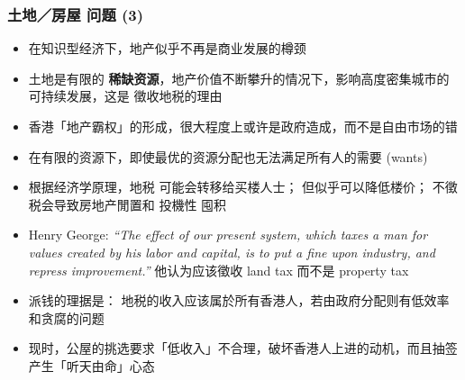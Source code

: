 \documentclass[10pt]{beamer}
\newcommand{\emp}[1]{{\color{blue}\textbf{#1}}}
\begin{document}
\begin{frame}
\frametitle{土地／房屋 问题 (3)}
\begin{itemize}
	\item 在知识型经济下，地产似乎不再是商业发展的樽颈
	
	\item 土地是有限的 \emp{稀缺资源}，地产价值不断攀升的情况下，影响高度密集城市的 可持续发展，这是 徵收地税的理由
	
	\item 香港「地产霸权」的形成，很大程度上或许是政府造成，而不是自由市场的错

	\nocite{Ryan-Collins2017}
	\nocite{Farvacque-Vitkoviac1992}
	\nocite{Blomley2004}
	\nocite{Linklater2013}
	\nocite{Adams2015}
	\nocite{简德三2012}
	\nocite{Poon2011}
	\nocite{潘慧娴2010}
	\nocite{OSullivan2012}
	\nocite{Rithmire2015}
	\nocite{Squires2013}
	\nocite{Harvey1996}
	\nocite{Girling1997}
	\nocite{Balia2009}
	\nocite{Peteri2003}
	\nocite{陈云2011}
	\nocite{周其仁2018}
	\nocite{Field2008}
	\nocite{Posner2018}

	\item 在有限的资源下，即使最优的资源分配也无法满足所有人的需要 (wants)

	\item 根据经济学原理，地税 可能会转移给买楼人士； 但似乎可以降低楼价； 不徵税会导致房地产閒置和 投機性 囤积
	
	\item Henry George: \textrm{\textit{``The effect of our present system, which taxes a man for values created by his labor and capital, is to put a fine upon industry, and repress improvement.''}} 他认为应该徵收 land tax 而不是 property tax

	\item 派钱的理据是： 地税的收入应该属於所有香港人，若由政府分配则有低效率和贪腐的问题
	
	\item 现时，公屋的挑选要求「低收入」不合理，破坏香港人上进的动机，而且抽签 产生「听天由命」心态




\end{itemize}
\end{frame}
\end{document}
